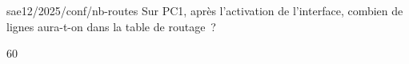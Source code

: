 \begin{question}{sae12/2025/conf/nb-routes}
  Sur PC1, après l'activation de l'interface, combien de lignes
  aura-t-on dans la table de routage~?
  \begin{reponses}{6}{0}
  \end{reponses}
\end{question}
